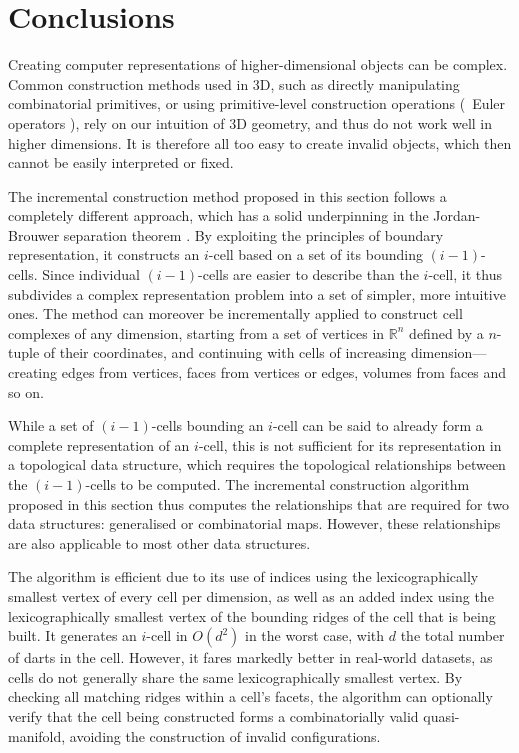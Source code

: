 \section{Conclusions}
\label{se:incremental-conclusions}

Creating computer representations of higher-dimensional objects can be complex.
Common construction methods used in 3D, such as directly manipulating combinatorial primitives, or using primitive-level construction operations (\eg\ Euler operators \citep{Mantyla88}), rely on our intuition of 3D geometry, and thus do not work well in higher dimensions.
It is therefore all too easy to create invalid objects, which then cannot be easily interpreted or fixed.

The incremental construction method proposed in this section follows a completely different approach, which has a solid underpinning in the Jordan-Brouwer separation theorem \citep{Lebesgue11,Brouwer11}.
By exploiting the principles of boundary representation, it constructs an $i$-cell based on a set of its bounding $(i-1)$-cells.
Since individual $(i-1)$-cells are easier to describe than the $i$-cell, it thus subdivides a complex representation problem into a set of simpler, more intuitive ones.
The method can moreover be incrementally applied to construct cell complexes of any dimension, starting from a set of vertices in $\mathbb{R}^n$ defined by a $n$-tuple of their coordinates, and continuing with cells of increasing dimension---creating edges from vertices, faces from vertices or edges, volumes from faces and so on.

While a set of $(i-1)$-cells bounding an $i$-cell can be said to already form a complete representation of an $i$-cell, this is not sufficient for its representation in a topological data structure, which requires the topological relationships between the $(i-1)$-cells to be computed.
The incremental construction algorithm proposed in this section thus computes the relationships that are required for two data structures: generalised or combinatorial maps.
However, these relationships are also applicable to most other data structures.

The algorithm is efficient due to its use of indices using the lexicographically smallest vertex of every cell per dimension, as well as an added index using the lexicographically smallest vertex of the bounding ridges of the cell that is being built.
It generates an $i$-cell in $O(d^{2})$ in the worst case, with $d$ the total number of darts in the cell.
However, it fares markedly better in real-world datasets, as cells do not generally share the same lexicographically smallest vertex.
By checking all matching ridges within a cell's facets, the algorithm can optionally verify that the cell being constructed forms a combinatorially valid quasi-manifold, avoiding the construction of invalid configurations.


